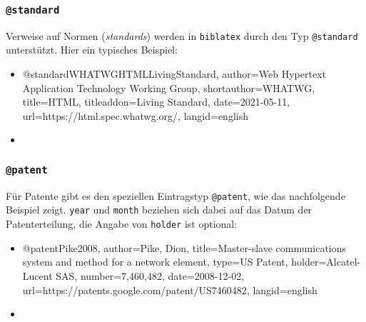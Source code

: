 
\subsubsection{\texttt{\bfseries @standard}}
\label{sec:@standard}


Verweise auf Normen (\emph{standards}) werden in \texttt{biblatex} durch den Typ \texttt{@standard} unterstützt. Hier
ein typisches Beispiel:
%
\begin{itemize}
\item[]
\begin{GenericCode}[numbers=none]
@standard{WHATWGHTMLLivingStandard,
  author={{Web Hypertext Application Technology Working Group}},
  shortauthor={WHATWG},
  title={HTML},
  titleaddon={Living Standard},
  date={2021-05-11},
  url={https://html.spec.whatwg.org/},
  langid={english}
}
\end{GenericCode}
\item[\cite{WHATWGHTMLLivingStandard}] 
\end{itemize}
%


\subsubsection{\texttt{\bfseries @patent}}
\label{sec:@patent}

Für Patente gibt es den speziellen Eintragstyp \texttt{@patent}, wie das nachfolgende Beispiel zeigt. \texttt{year}
und \texttt{month} beziehen sich dabei auf das Datum der Patenterteilung, die Angabe von \texttt{holder} ist optional:
%
\begin{itemize}
\item[]
\begin{GenericCode}[numbers=none]
@patent{Pike2008,
  author={Pike, Dion},
  title={Master-slave communications system and method for a network element},
  type={US Patent},
  holder={Alcatel-Lucent SAS},
  number={7,460,482},
  date={2008-12-02},
  url={https://patents.google.com/patent/US7460482},
  langid={english}
}
\end{GenericCode}
\item[\cite{Pike2008}] 
\end{itemize}
%


